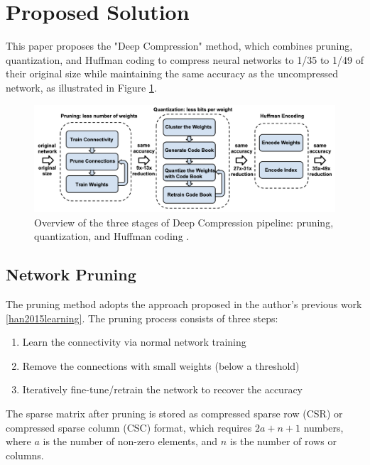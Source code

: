 \documentclass[12pt]{article}
\begin{document}

\section{Proposed Solution}

This paper proposes the "Deep Compression" method, which combines pruning, quantization, and Huffman coding to compress neural networks to 1/35 to 1/49 of their original size while maintaining the same accuracy as the uncompressed network, as illustrated in Figure \ref{fig:method_overview}.

\begin{figure}
    \centering
    \includegraphics[width=0.9\linewidth]{images/f1_method_overview.png}
    \caption{Overview of the three stages of Deep Compression pipeline: pruning, quantization, and Huffman coding \cite{han2015deep_compression}.}
    \label{fig:method_overview}
\end{figure}

\subsection{Network Pruning}

The pruning method adopts the approach proposed in the author's previous work \ref{han2015learning}. The pruning process consists of three steps:

\begin{enumerate}
    \item Learn the connectivity via normal network training
    \item Remove the connections with small weights (below a threshold)
    \item Iteratively fine-tune/retrain the network to recover the accuracy
\end{enumerate}

The sparse matrix after pruning is stored as compressed sparse row (CSR) or compressed sparse column (CSC) format, which requires $2a+n+1$ numbers, where $a$ is the number of non-zero elements, and $n$ is the number of rows or columns.
\end{document}
